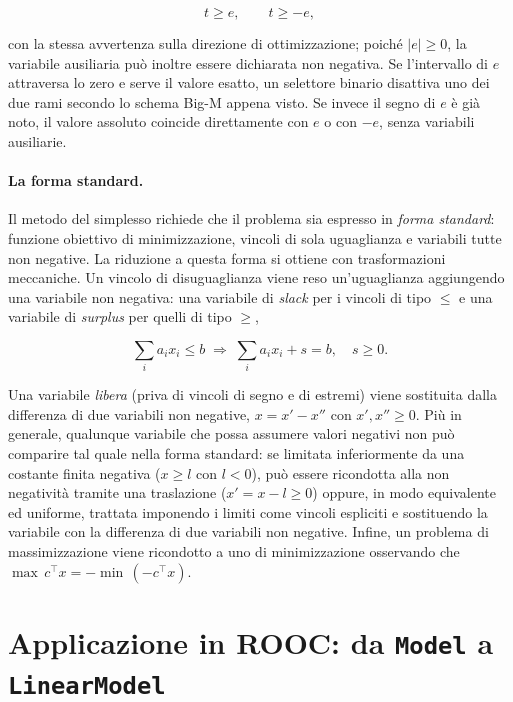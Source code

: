 \begin{equation}
\label{eq:abs-lin}
t \ge e, \qquad t \ge -e,
\end{equation}

con la stessa avvertenza sulla direzione di ottimizzazione; poiché $|e| \ge
0$, la variabile ausiliaria può inoltre essere dichiarata non negativa. Se
l'intervallo di $e$ attraversa lo zero e serve il valore esatto, un selettore
binario disattiva uno dei due rami secondo lo schema Big-M appena visto. Se
invece il segno di $e$ è già noto, il valore assoluto coincide direttamente
con $e$ o con $-e$, senza variabili ausiliarie.

\paragraph{La forma standard.}
Il metodo del simplesso richiede che il problema sia espresso in \emph{forma
standard}: funzione obiettivo di minimizzazione, vincoli di sola uguaglianza e
variabili tutte non negative. La riduzione a questa forma si ottiene con
trasformazioni meccaniche. Un vincolo di disuguaglianza viene reso
un'uguaglianza aggiungendo una variabile non negativa: una variabile di
\emph{slack} per i vincoli di tipo $\le$ e una variabile di \emph{surplus} per
quelli di tipo $\ge$,

\begin{equation}
\label{eq:slack}
\textstyle\sum_i a_i x_i \le b \;\Longrightarrow\; \sum_i a_i x_i + s = b, \quad s \ge 0.
\end{equation}

Una variabile \emph{libera} (priva di vincoli di segno e di estremi) viene
sostituita dalla differenza di due variabili non negative, $x = x' - x''$ con
$x', x'' \ge 0$. Più in generale, qualunque variabile che possa assumere valori
negativi non può comparire tal quale nella forma standard: se limitata inferiormente
da una costante finita negativa ($x \ge l$ con $l < 0$), può essere ricondotta alla
non negatività tramite una traslazione ($x' = x - l \ge 0$) oppure, in modo
equivalente ed uniforme, trattata imponendo i limiti come vincoli espliciti e
sostituendo la variabile con la differenza di due variabili non negative.
Infine, un problema di massimizzazione viene ricondotto a uno di
minimizzazione osservando che $\max\, c^\top x = -\min\, (-c^\top x)$.

\section{Applicazione in ROOC: da \texttt{Model} a \texttt{LinearModel}}
\label{sec:linear-model}

